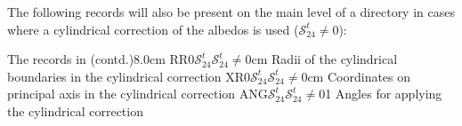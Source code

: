 The following records will also be present on the main level of a 
directory in cases where a cylindrical correction of the albedos is used ($\mathcal{S}^{t}_{24}\ne 0$):

\begin{DescriptionEnregistrement}{The  records in
 (contd.)}{8.0cm}
\OptRealEnr
  {RR0}{$\mathcal{S}^{t}_{24}$}{$\mathcal{S}^{t}_{24}\ne 0$}{cm}
  {Radii of the cylindrical boundaries in the cylindrical correction}
\OptRealEnr
  {XR0}{$\mathcal{S}^{t}_{24}$}{$\mathcal{S}^{t}_{24}\ne 0$}{cm}
  {Coordinates on principal axis in the cylindrical correction}
\OptRealEnr
  {ANG}{$\mathcal{S}^{t}_{24}$}{$\mathcal{S}^{t}_{24}\ne 0$}{1}
  {Angles for applying the cylindrical correction}
\end{DescriptionEnregistrement}

\eject
